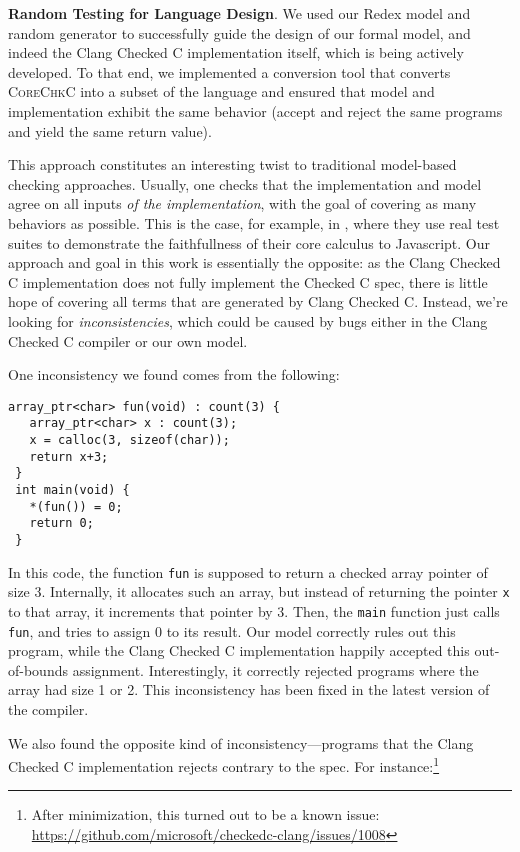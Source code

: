 \documentclass[conference]{IEEEtran}
\newcommand{\myparagraph}[1]{\textbf{#1}.\xspace}
\newcommand{\code}[1]{\lstinline|#1|}
\newcommand{\lang}{\textsc{CoreChkC}\xspace}
\newcommand{\checkedc}{\text{Checked C}\xspace}
\begin{document}
\myparagraph{Random Testing for Language Design}
We used our Redex model and random generator to successfully guide the
design of our formal model, and indeed the Clang Checked C
implementation itself, which is being actively developed. To that end, we implemented a
conversion tool that converts \lang into a subset of the \checkedc
language and ensured that model and implementation exhibit the same
behavior (accept and reject the same programs and yield the same return
value).

This approach constitutes an interesting twist to traditional
model-based checking approaches.  Usually, one checks that the
implementation and model agree on all inputs \emph{of the
  implementation}, with the goal of covering as many behaviors as
possible. This is the case, for example, in \citet{lambdajs}, where
they use real test suites to demonstrate the faithfullness of their
core calculus to Javascript. Our approach and goal in this work is
essentially the opposite: as the Clang Checked C implementation does
not fully implement the Checked C spec, there is little hope of
covering all terms that are generated by Clang Checked C. Instead,
we're looking for \emph{inconsistencies}, which could be caused by
bugs either in the Clang Checked C compiler or our own model.  

One inconsistency we found comes from the following:

{\small 
\begin{lstlisting}[xleftmargin=4 mm]
array_ptr<char> fun(void) : count(3) {
   array_ptr<char> x : count(3);
   x = calloc(3, sizeof(char));
   return x+3;
 }
 int main(void) {
   *(fun()) = 0;
   return 0;
 }
\end{lstlisting}
}\noindent
In this code, the function \code{fun} is supposed to return a
checked array pointer of size 3. Internally, it allocates such an
array, but instead of returning the pointer \code{x} to that array, it
increments that pointer by 3. Then, the \code{main} function just
calls \code{fun}, and tries to assign 0 to its result. Our model
correctly rules out this program, while the Clang Checked C
implementation happily accepted this out-of-bounds
assignment. Interestingly, it correctly rejected programs where the
array had size 1 or 2. This inconsistency has been fixed in the latest
version of the compiler.

We also found the opposite kind of inconsistency---programs that
the Clang Checked C implementation rejects contrary to the spec.
For instance:\footnote{After minimization, this turned out to be a known issue: 
  \url{https://github.com/microsoft/checkedc-clang/issues/1008}}
\end{document}
